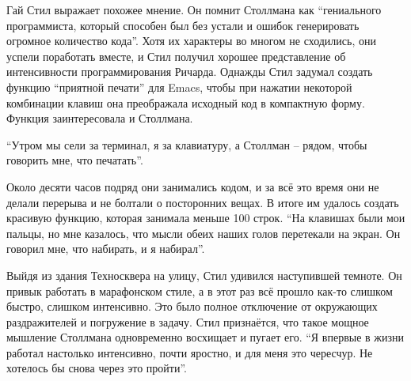 Гай Стил выражает похожее мнение. Он помнит Столлмана как \enquote{гениального программиста, который способен был без устали и ошибок генерировать огромное количество кода}. Хотя их характеры во многом не сходились, они успели поработать вместе, и Стил получил хорошее представление об интенсивности программирования Ричарда. Однажды Стил задумал создать функцию \enquote{приятной печати} для Emacs, чтобы при нажатии некоторой комбинации клавиш она преображала исходный код в компактную форму. Функция заинтересовала и Столлмана.

\enquote{Утром мы сели за терминал, я за клавиатуру, а Столлман -- рядом, чтобы говорить мне, что печатать}.

Около десяти часов подряд они занимались кодом, и за всё это время они не делали перерыва и не болтали о посторонних вещах. В итоге им удалось создать красивую функцию, которая занимала меньше 100 строк. \enquote{На клавишах были мои пальцы, но мне казалось, что мысли обеих наших голов перетекали на экран. Он говорил мне, что набирать, и я набирал}.

Выйдя из здания Техносквера на улицу, Стил удивился наступившей темноте. Он привык работать в марафонском стиле, а в этот раз всё прошло как-то слишком быстро, слишком интенсивно. Это было полное отключение от окружающих раздражителей и погружение в задачу. Стил признаётся, что такое мощное мышление Столлмана одновременно восхищает и пугает его. \enquote{Я впервые в жизни работал настолько интенсивно, почти яростно, и для меня это чересчур. Не хотелось бы снова через это пройти}.
